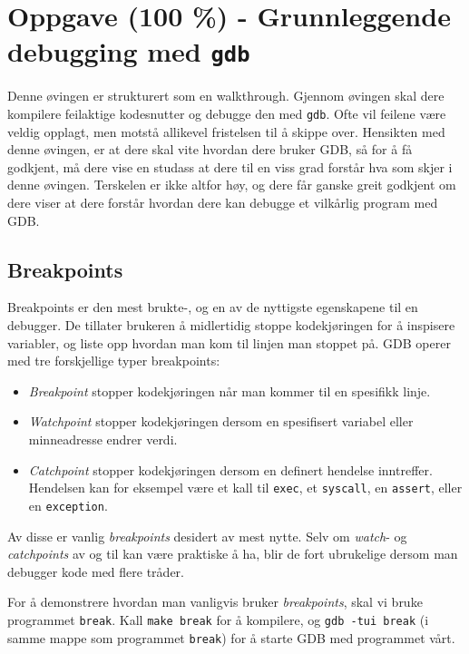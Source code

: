 \section{Oppgave (100 \%) - Grunnleggende debugging med \texttt{gdb}}\label{sec:3-oppgave}

Denne øvingen er strukturert som en walkthrough. Gjennom øvingen skal dere kompilere feilaktige kodesnutter og debugge den med \verb|gdb|. Ofte vil feilene være veldig opplagt, men motstå allikevel fristelsen til å skippe over. Hensikten med denne øvingen, er at dere skal vite hvordan dere bruker GDB, så for å få godkjent, må dere vise en studass at dere til en viss grad forstår hva som skjer i denne øvingen. Terskelen er ikke altfor høy, og dere får ganske greit godkjent om dere viser at dere forstår hvordan dere kan debugge et vilkårlig program med GDB.

\subsection{Breakpoints}

Breakpoints er den mest brukte-, og en av de nyttigste egenskapene til en debugger. De tillater brukeren å midlertidig stoppe kodekjøringen for å inspisere variabler, og liste opp hvordan man kom til linjen man stoppet på. GDB operer med tre forskjellige typer breakpoints:

\begin{itemize}
    \item \textit{Breakpoint} stopper kodekjøringen når man kommer til en spesifikk linje.
    \item \textit{Watchpoint} stopper kodekjøringen dersom en spesifisert variabel eller minneadresse endrer verdi.
    \item \textit{Catchpoint} stopper kodekjøringen dersom en definert hendelse inntreffer. Hendelsen kan for eksempel være et kall til \verb|exec|, et \verb|syscall|, en \verb|assert|, eller en \verb|exception|.
\end{itemize}

Av disse er vanlig \textit{breakpoints} desidert av mest nytte. Selv om \textit{watch}- og \textit{catchpoints} av og til kan være praktiske å ha, blir de fort ubrukelige dersom man debugger kode med flere tråder.

For å demonstrere hvordan man vanligvis bruker \textit{breakpoints}, skal vi bruke programmet \verb|break|. Kall \verb|make break| for å kompilere, og \verb|gdb -tui break| (i samme mappe som programmet \verb|break|) for å starte GDB med programmet vårt. 

